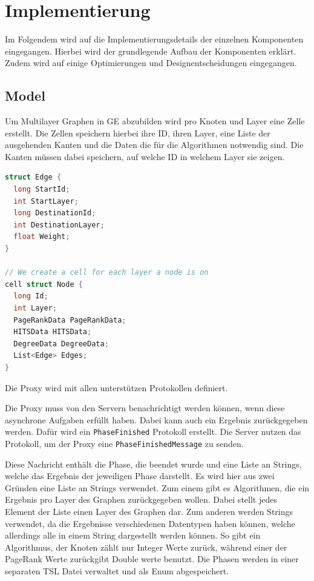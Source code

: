 \section{Implementierung}

Im Folgendem wird auf die Implementierungsdetails der einzelnen Komponenten eingegangen. Hierbei wird der grundlegende Aufbau der Komponenten erklärt.
Zudem wird auf einige Optimierungen und Designentscheidungen eingegangen.


\subsection{Model}

Um Multilayer Graphen in GE abzubilden wird pro Knoten und Layer eine Zelle erstellt. Die Zellen speichern hierbei ihre ID, ihren Layer, eine Liste der ausgehenden Kanten und die Daten die für die Algorithmen notwendig sind.
Die Kanten müssen dabei speichern, auf welche ID in welchem Layer sie zeigen.

\begin{lstlisting}[language=c,label={lst:tslModel}, caption={TSl Definition von Multilayer Knoten und Kanten.}]
struct Edge {
  long StartId;
  int StartLayer;
  long DestinationId;
  int DestinationLayer;
  float Weight;
}

// We create a cell for each layer a node is on
cell struct Node {
  long Id;
  int Layer;
  PageRankData PageRankData;
  HITSData HITSData;
  DegreeData DegreeData;
  List<Edge> Edges;
}
\end{lstlisting}

Die Proxy wird mit allen unterstützen Protokollen definiert. 

Die Proxy muss von den Servern benachrichtigt werden können, wenn diese asynchrone Aufgaben erfüllt haben. Dabei kann auch ein Ergebnis zurückgegeben werden.
Dafür wird ein \verb|PhaseFinished| Protokoll erstellt. Die Server nutzen das Protokoll, um der Proxy eine \verb|PhaseFinishedMessage| zu senden.

Diese Nachricht enthält die Phase, die beendet wurde und eine Liste an Strings, welche das Ergebnis der jeweiligen Phase darstellt. Es wird hier aus zwei Gründen eine Liste an Strings verwendet. Zum einem gibt es Algorithmen, die ein Ergebnis pro Layer des Graphen zurückgegeben wollen.
Dabei stellt jedes Element der Liste einen Layer des Graphen dar. Zum anderen werden Strings verwendet, da die Ergebnisse verschiedenen Datentypen haben können, welche allerdings alle in einem String dargestellt werden können. So gibt ein Algorithmus, der Knoten zählt nur Integer Werte zurück, während einer der PageRank Werte zurückgibt Double werte benutzt.
Die Phasen werden in einer separaten TSL Datei verwaltet und als Enum abgespeichert.

